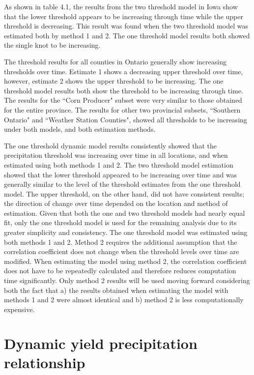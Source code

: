 As shown in table 4.1, the results from the two threshold model in Iowa show that the lower threshold appears to be increasing through time while the upper threshold is decreasing. This result was found when the two threshold model was estimated both by method 1 and 2. The one threshold model results both showed the single knot to be increasing. 

The threshold results for all counties in Ontario generally show increasing thresholds over time. Estimate 1 shows a decreasing upper threshold over time, however, estimate 2 shows the upper threshold to be increasing. The one threshold model results both show the threshold to be increasing through time. The results for the ``Corn Producer" subset were very similar to those obtained for the entire province. The results for other two provincial subsets, ``Southern Ontario" and ``Weather Station Counties", showed all thresholds to be increasing under both models, and both estimation methods.

 The one threshold dynamic model results consistently showed that the precipitation threshold was increasing over time in all locations, and when estimated using both methods 1 and 2. The two threshold model estimation showed that the lower threshold appeared to be increasing over time and was generally similar to the level of the threshold estimates from the one threshold model.  The upper threshold, on the other hand, did not have consistent results; the direction of change over time depended on the location and method of estimation. Given that both the one and two threshold models had nearly equal fit, only the one threshold model is used for the remaining analysis due to its greater simplicity and consistency. The one threshold model was estimated using both methods 1 and 2. Method 2 requires the additional assumption that the correlation coefficient does not change when the threshold levels over time are modified. When estimating the model using method 2, the correlation coefficient does not have to be repeatedly calculated and therefore reduces computation time significantly. Only method 2 results will be used moving forward considering both the fact that a) the results obtained when estimating the model with methods 1 and 2 were almost identical and b) method 2 is less computationally expensive. 
 
 \section{Dynamic yield precipitation relationship}

